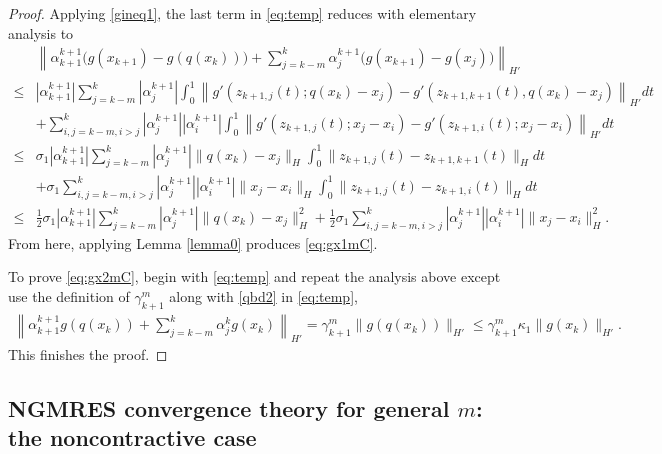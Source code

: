 \documentclass{article}
\numberwithin{equation}{section}
\begin{document}
\begin{proof}
Applying  \eqref{gineq1}, the last term in \eqref{eq:temp} reduces with elementary analysis to
\begin{align}
 & \left\| \alpha_{k+1}^{k+1} \bigg(g (x_{k+1}) - g(q(x_k)) \bigg)
    + \sum\limits_{j=k-m}^k \alpha_j^{k+1}\bigg( g(x_{k+1})  - g(x_j) \bigg) \right\|_{H'}
    \nonumber \\
    \le &    |\alpha_{k+1}^{k+1}| \sum\limits_{j=k-m}^k |\alpha_j^{k+1}|  \int_0^1  \left\|g'(z_{k+1,j}(t); q(x_k)-x_j) - g'(z_{k+1,k+1}(t), q(x_k)-x_j) \right\|_{H'} dt 
    \nonumber \\ &
     +  \sum\limits_{i,j=k-m, i>j}^k |\alpha_j^{k+1}||\alpha_i^{k+1}| \int_0^1 \left\| g'(z_{k+1,j}(t); x_j - x_i) - g'(z_{k+1, i}(t); x_j - x_i)  \right\|_{H'}dt 
     \nonumber \\
     \le & \sigma_1 |\alpha_{k+1}^{k+1}| \sum\limits_{j=k-m}^k |\alpha_j^{k+1}| \| q(x_k) - x_j\|_{H} \int_0^1\|z_{k+1,j}(t) - z_{k+1,k+1}(t)\|_{H} dt
    \nonumber \\&
    + \sigma_1\sum\limits_{i,j = k-m, i>j}^k |\alpha_j^{k+1}||\alpha_i^{k+1}| \|x_j - x_i\|_{H} \int_0^1 \| z_{k+1, j}(t) - z_{k+1,i}(t)\|_{H}dt 
    \nonumber \\
    \le & 
\frac{1}{2}\sigma_1 |\alpha_{k+1}^{k+1}| \sum\limits_{j=k-m}^k |\alpha_j^{k+1}| \| q(x_k) - x_j\|_{H}^2
    + \frac{1}{2}\sigma_1\sum\limits_{i,j = k-m, i>j}^k |\alpha_j^{k+1}||\alpha_i^{k+1}| \|x_j - x_i\|_{H}^2. \label{P1}
\end{align}
From here, applying Lemma \ref{lemma0} produces \eqref{eq:gx1mC}.
 
To prove \eqref{eq:gx2mC}, begin with \eqref{eq:temp} and repeat the analysis above except use the definition of $\gamma_{k+1}^m$ along with \eqref{qbd2} in \eqref{eq:temp},
  \begin{align*}
      \left\| \alpha_{k+1}^{k+1} g(q(x_k)) + \sum\limits_{j= k-m}^k \alpha_j^k g(x_k)  \right\|_{H'} = \gamma^m_{k+1} \| g(q(x_k))\|_{H'} \le \gamma^m_{k+1} \kappa_1 \| g(x_k)\|_{H'}.
  \end{align*} 
  This finishes the proof.
  \end{proof}



\subsection{NGMRES convergence theory for general $m$: the noncontractive case}
\end{document}
